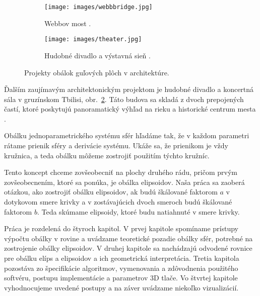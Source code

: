 \begin{figure}[h]
    \centering
    \begin{subfigure}[b]{0.6\textwidth}
        \centering
        \texttt{[image: images/webbbridge.jpg]}
        \caption[Webbov most.]{Webbov most \cite{WebbBridge}.}
        \label{fig:webb_bridge}
    \end{subfigure}
    \hfill
    \begin{subfigure}[b]{0.6\textwidth}
        \centering
        \texttt{[image: images/theater.jpg]}
        \caption[Hudobné divadlo a výstavná sieň.]{Hudobné divadlo a výstavná sieň \cite{MusicTheater}.}
        \label{fig:theater}
    \end{subfigure}
    \caption{Projekty obálok guľových plôch v architektúre.}
    \label{fig:projects}
\end{figure}


Ďalším zaujímavým architektonickým projektom je hudobné divadlo a koncertná sála v gruzínskom Tbilisi, obr.~\ref{fig:theater}. Táto budova sa skladá z dvoch prepojených častí, ktoré poskytujú panoramatický výhľad na rieku a historické centrum mesta \cite{Mesz18}.

Obálku jednoparametrického systému sfér hľadáme tak, že v každom parametri rátame prienik sféry a derivácie systému. Ukáže sa, že prienikom je vždy kružnica, a teda obálku môžeme zostrojiť použitím týchto kružníc. 

Tento koncept chceme zovšeobecniť na plochy druhého rádu, pričom prvým zovšeobecnením, ktoré sa ponúka, je obálka elipsoidov. Naša práca sa zaoberá otázkou, ako zostrojiť obálku elipsoidov, ak budú škálované faktorom $a$ v dotykovom smere krivky a v zostávajúcich dvoch smeroch budú škálované faktorom $b$. Teda skúmame elipsoidy, ktoré budu natiahnuté v smere krivky.

Práca je rozdelená do štyroch kapitol. V prvej kapitole spomíname prístupy výpočtu obálky v rovine a uvádzame teoretické pozadie obálky sfér, potrebné na zostrojenie obálky elipsoidov. V druhej kapitole sa nachádzajú odvodené rovnice pre obálku elíps a elipsoidov a ich geometrická interpretácia. Tretia kapitola pozostáva zo špecifikácie algoritmov, vymenovania a zdôvodnenia použitého softvéru, postupu implementácie a parametrov 3D tlače. Vo štvrtej kapitole vyhodnocujeme uvedené postupy a na záver uvádzame niekoľko vizualizácií.